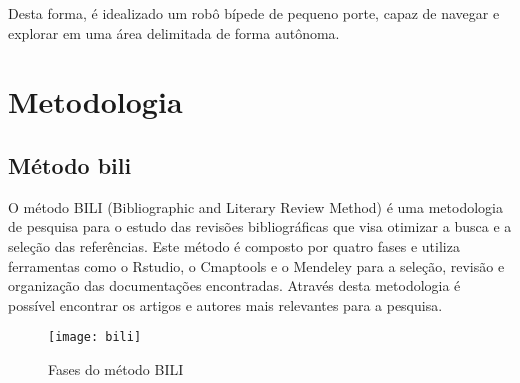 Desta forma, é idealizado um robô bípede de pequeno porte, capaz de navegar e explorar em uma área delimitada de forma autônoma.









\chapter{Metodologia}
\label{chap:metod}

\section{Método bili}
\label{sec:bili}

O método BILI (Bibliographic and Literary Review Method) é uma metodologia de pesquisa para o estudo das revisões bibliográficas que visa otimizar a busca e a seleção das referências. Este método é composto por quatro fases e utiliza  ferramentas como o  Rstudio, o Cmaptools e o Mendeley para a seleção, revisão e organização das documentações encontradas. Através desta metodologia é possível encontrar os artigos e autores mais relevantes para a pesquisa.

\begin{figure} [H]	
    \centering
    \caption{Fases do método BILI}
    \texttt{[image: bili]}
    \label{fig:bili}
\end{figure}

